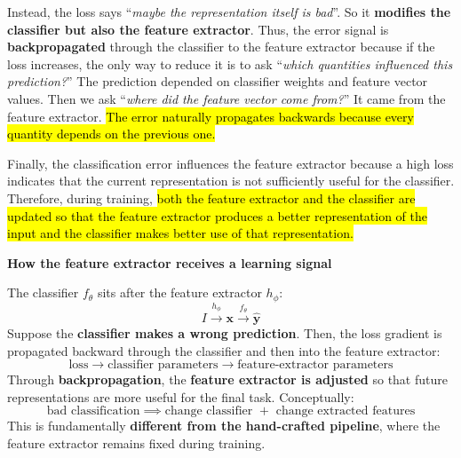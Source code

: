 \begin{deepeningbox}
    \highspace
    Instead, the loss says ``\emph{maybe the representation itself is bad}''. So it \textbf{modifies the classifier but also the feature extractor}. Thus, the error signal is \textbf{backpropagated} through the classifier to the feature extractor because if the loss increases, the only way to reduce it is to ask ``\emph{which quantities influenced this prediction?}'' The prediction depended on classifier weights and feature vector values. Then we ask ``\emph{where did the feature vector come from?}'' It came from the feature extractor. \hl{The error naturally propagates backwards because every quantity depends on the previous one.}

    \highspace
    Finally, the classification error influences the feature extractor because a high loss indicates that the current representation is not sufficiently useful for the classifier. Therefore, during training, \hl{both the feature extractor and the classifier are updated so that the feature extractor produces a better representation of the input and the classifier makes better use of that representation.}
\end{deepeningbox}

\highspace
\begin{flushleft}
    \textcolor{Green3}{ \textbf{How the feature extractor receives a learning signal}}
\end{flushleft}
The classifier $f_{\theta}$ sits after the feature extractor $h_{\phi}$:
\begin{equation*}
    I \xrightarrow{h_{\phi}} \mathbf{x} \xrightarrow{f_{\theta}} \hat{\mathbf{y}}
\end{equation*}
Suppose the \textbf{classifier makes a wrong prediction}. Then, the loss gradient is propagated backward through the classifier and then into the feature extractor:
\begin{equation*}
    \text{loss} \to \text{classifier parameters} \to \text{feature-extractor parameters}
\end{equation*}
Through \textbf{backpropagation}, the \textbf{feature extractor is adjusted} so that future representations are more useful for the final task. Conceptually:
\begin{equation*}
    \text{bad classification} \implies \text{change classifier } + \text{ change extracted features}
\end{equation*}
This is fundamentally \textbf{different from the hand-crafted pipeline}, where the feature extractor remains fixed during training.

